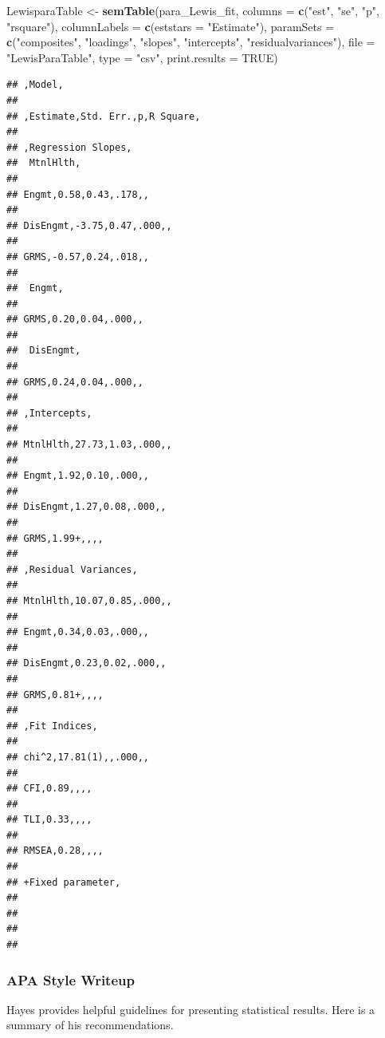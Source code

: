 \documentclass[
  11pt,
]{book}
\newenvironment{Shaded}{\begin{snugshade}}{\end{snugshade}}
\newcommand{\AttributeTok}[1]{\textcolor[rgb]{0.27,0.27,0.27}{#1}}
\newcommand{\ConstantTok}[1]{\textcolor[rgb]{0.37,0.37,0.37}{#1}}
\newcommand{\FunctionTok}[1]{\textcolor[rgb]{0.27,0.27,0.27}{\textbf{#1}}}
\newcommand{\NormalTok}[1]{#1}
\newcommand{\OtherTok}[1]{\textcolor[rgb]{0.37,0.37,0.37}{#1}}
\newcommand{\StringTok}[1]{\textcolor[rgb]{0.5,0.5,0.5}{#1}}
\begin{document}
\begin{Shaded}
\begin{Highlighting}[]
\NormalTok{LewisparaTable }\OtherTok{\textless{}{-}} \FunctionTok{semTable}\NormalTok{(para\_Lewis\_fit, }\AttributeTok{columns =} \FunctionTok{c}\NormalTok{(}\StringTok{"est"}\NormalTok{, }\StringTok{"se"}\NormalTok{, }\StringTok{"p"}\NormalTok{, }\StringTok{"rsquare"}\NormalTok{),  }\AttributeTok{columnLabels =} \FunctionTok{c}\NormalTok{(}\AttributeTok{eststars =} \StringTok{"Estimate"}\NormalTok{), }\AttributeTok{paramSets =} \FunctionTok{c}\NormalTok{(}\StringTok{"composites"}\NormalTok{, }\StringTok{"loadings"}\NormalTok{, }\StringTok{"slopes"}\NormalTok{, }\StringTok{"intercepts"}\NormalTok{, }\StringTok{"residualvariances"}\NormalTok{), }\AttributeTok{file =} \StringTok{"LewisParaTable"}\NormalTok{, }\AttributeTok{type =} \StringTok{"csv"}\NormalTok{, }\AttributeTok{print.results =} \ConstantTok{TRUE}\NormalTok{)}
\end{Highlighting}
\end{Shaded}

\begin{verbatim}
## ,Model,
##  
## ,Estimate,Std. Err.,p,R Square,
## 
## ,Regression Slopes,
##  MtnlHlth,
## 
## Engmt,0.58,0.43,.178,,
## 
## DisEngmt,-3.75,0.47,.000,,
## 
## GRMS,-0.57,0.24,.018,,
## 
##  Engmt,
## 
## GRMS,0.20,0.04,.000,,
## 
##  DisEngmt,
## 
## GRMS,0.24,0.04,.000,,
## 
## ,Intercepts,
## 
## MtnlHlth,27.73,1.03,.000,,
## 
## Engmt,1.92,0.10,.000,,
## 
## DisEngmt,1.27,0.08,.000,,
## 
## GRMS,1.99+,,,,
## 
## ,Residual Variances,
## 
## MtnlHlth,10.07,0.85,.000,,
## 
## Engmt,0.34,0.03,.000,,
## 
## DisEngmt,0.23,0.02,.000,,
## 
## GRMS,0.81+,,,,
## 
## ,Fit Indices,
## 
## chi^2,17.81(1),,.000,,
## 
## CFI,0.89,,,,
## 
## TLI,0.33,,,,
## 
## RMSEA,0.28,,,,
## 
## +Fixed parameter,
## 
## 
## 
## 
\end{verbatim}

\hypertarget{apa-style-writeup-1}{%
\subsubsection{APA Style Writeup}\label{apa-style-writeup-1}}

Hayes \citeyearpar{hayes_introduction_2018} provides helpful guidelines for presenting statistical results. Here is a summary of his recommendations.
\end{document}
